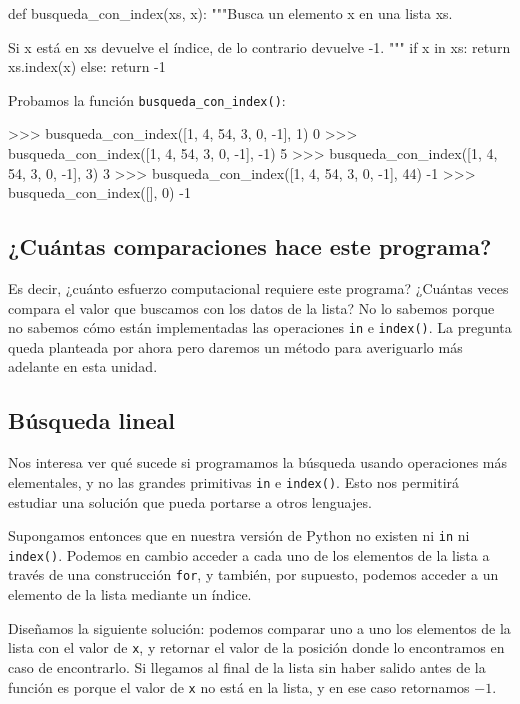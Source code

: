 \begin{codigo-python-sn}
def busqueda_con_index(xs, x):
    """Busca un elemento x en una lista xs.

    Si x está en xs devuelve el índice,
    de lo contrario devuelve -1.
    """
    if x in xs:
        return xs.index(x)
    else:
        return -1
\end{codigo-python-sn}

Probamos la función \verb+busqueda_con_index()+:

\begin{codigo-python-sn}
>>> busqueda_con_index([1, 4, 54, 3, 0, -1], 1)
0
>>> busqueda_con_index([1, 4, 54, 3, 0, -1], -1)
5
>>> busqueda_con_index([1, 4, 54, 3, 0, -1], 3)
3
>>> busqueda_con_index([1, 4, 54, 3, 0, -1], 44)
-1
>>> busqueda_con_index([], 0)
-1
\end{codigo-python-sn}

\subsection*{¿Cuántas comparaciones hace este programa?}

Es decir, ¿cuánto esfuerzo computacional requiere
este programa? ¿Cuántas veces compara el valor que buscamos con los datos de
la lista? No lo sabemos porque no sabemos cómo están implementadas las
operaciones \lstinline+in+ e \lstinline+index()+. La pregunta queda planteada
por ahora pero daremos un método para averiguarlo más adelante en esta unidad.

\subsection*{Búsqueda lineal}

Nos interesa ver qué sucede si programamos la búsqueda usando operaciones más
elementales, y no las grandes primitivas \lstinline+in+ e \lstinline+index()+.
Esto nos permitirá estudiar una solución que pueda portarse a otros lenguajes.

Supongamos entonces que en nuestra versión de Python no existen ni \lstinline+in+
ni \lstinline+index()+. Podemos en cambio acceder a cada uno de los elementos
de la lista a través de una construcción \lstinline+for+, y también, por
supuesto, podemos acceder a un elemento de la lista mediante un índice.

Diseñamos la siguiente solución: podemos comparar uno a uno los elementos de la
lista con el valor de \lstinline!x!, y retornar el valor de la posición
donde lo encontramos en caso de encontrarlo.
Si llegamos al final de la lista sin haber salido antes de la función es
porque el valor de \lstinline!x! no está en la lista, y en ese caso
retornamos $-1$.

